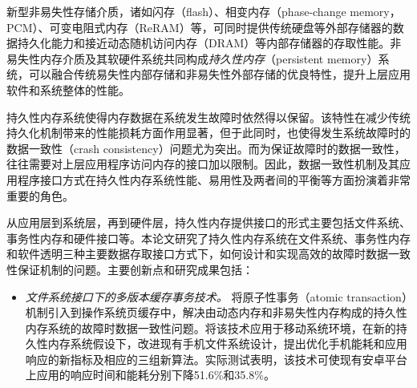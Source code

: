 \begin{cabstract}

新型非易失性存储介质，诸如闪存（flash）、相变内存（phase-change memory，PCM）、可变电阻式内存（ReRAM）等，可同时提供传统硬盘等外部存储器的数据持久化能力和接近动态随机访问内存（DRAM）等内部存储器的存取性能。非易失性内存介质及其软硬件系统共同构成\emph{持久性内存}（persistent memory）系统，可以融合传统易失性内部存储和非易失性外部存储的优良特性，提升上层应用软件和系统整体的性能。

持久性内存系统使得内存数据在系统发生故障时依然得以保留。该特性在减少传统持久化机制带来的性能损耗方面作用显著，但于此同时，也使得发生系统故障时的数据一致性（crash consistency）问题尤为突出。而为保证故障时的数据一致性，往往需要对上层应用程序访问内存的接口加以限制。因此，数据一致性机制及其应用程序接口方式在持久性内存系统性能、易用性及两者间的平衡等方面扮演着非常重要的角色。



从应用层到系统层，再到硬件层，持久性内存提供接口的形式主要包括文件系统、事务性内存和硬件接口等。本论文研究了持久性内存系统在文件系统、事务性内存和软件透明三种主要数据存取接口方式下，如何设计和实现高效的故障时数据一致性保证机制的问题。主要创新点和研究成果包括：

\begin{itemize}
\item \emph{文件系统接口下的多版本缓存事务技术。}
将原子性事务（atomic transaction）机制引入到操作系统页缓存中，解决由动态内存和非易失性内存构成的持久性内存系统的故障时数据一致性问题。将该技术应用于移动系统环境，在新的持久性内存系统假设下，改进现有手机文件系统设计，提出优化手机能耗和应用响应的新指标及相应的三组新算法。实际测试表明，该技术可使现有安卓平台上应用的响应时间和能耗分别下降51.6\%和35.8\%。


\end{itemize}
\end{cabstract}
